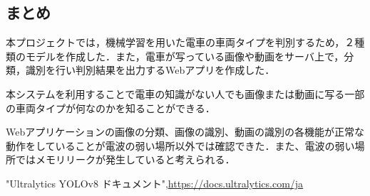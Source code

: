 \begin{multicols*}{2}
\section{まとめ}
本プロジェクトでは，機械学習を用いた電車の車両タイプを判別するため，２種類のモデルを作成した．また，電車が写っている画像や動画をサーバ上で，分類，識別を行い判別結果を出力するWebアプリを作成した．

本システムを利用することで電車の知識がない人でも画像または動画に写る一部の車両タイプが何なのかを知ることができる．


Webアプリケーションの画像の分類、画像の識別、動画の識別の各機能が正常な動作をしていることが電波の弱い場所以外では確認できた．また、電波の弱い場所ではメモリリークが発生していると考えられる．%
\begin{thebibliography}{99}
"Ultralytics YOLOv8 ドキュメント",\url{https://docs.ultralytics.com/ja}
\end{thebibliography}


\end{multicols*} 


